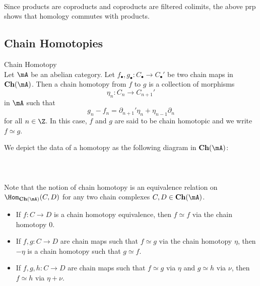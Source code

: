 \documentclass[a4paper]{article}
\begin{document}
\begin{eg}{}{}\\
Since products are coproducts and coproducts are filtered colimits, the above prp shows that homology commutes with products. 
\end{eg}

\subsection{Chain Homotopies}
\begin{defn}{Chain Homotopy}{}\\
Let $\mA$ be an abelian category. Let $f_\bullet,g_\bullet:C_\bullet\to C_\bullet'$ be two chain maps in $\bold{Ch}(\mA)$. Then a chain homotopy from $f$ to $g$ is a collection of morphisms $$\eta_n:C_n\to C_{n+1}'$$ in $\mA$ such that $$g_n-f_n=\partial_{n+1}'\eta_n+\eta_{n-1}\partial_n$$ for all $n\in\Z$. In this case, $f$ and $g$ are said to be chain homotopic and we write $f\simeq g$. 
\end{defn}

We depict the data of a homotopy as the following diagram in $\bold{Ch}(\mA)$: \\~\\
\\~\\

Note that the notion of chain homotopy is an equivalence relation on $\Hom_{\bold{Ch}(\mA)}(C,D)$ for any two chain complexes $C,D\in\bold{Ch}(\mA)$. 
\begin{itemize}
\item If $f:C\to D$ is a chain homotopy equivalence, then $f\simeq f$ via the chain homotopy $0$. 
\item If $f,g:C\to D$ are chain maps such that $f\simeq g$ via the chain homotopy $\eta$, then $-\eta$ is a chain homotopy such that $g\simeq f$. 
\item If $f,g,h:C\to D$ are chain maps such that $f\simeq g$ via $\eta$ and $g\simeq h$ via $\nu$, then $f\simeq h$ via $\eta+\nu$. 
\end{itemize}
\end{document}
